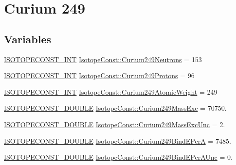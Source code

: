 \hypertarget{group___isotope_const-_curium-_cm249}{}\section{Curium 249}
\label{group___isotope_const-_curium-_cm249}
\subsection*{Variables}
\begin{DoxyCompactItemize}
\item 
\mbox{\hyperlink{group___isotope_const-_macros_ga5f18360b3e99483a35c32d789e62621c}{I\+S\+O\+T\+O\+P\+E\+C\+O\+N\+S\+T\+\_\+\+I\+NT}} \mbox{\hyperlink{group___isotope_const-_curium-_cm249_gaf093c22f0fdc8d87c691b7add8e28bb1}{Isotope\+Const\+::\+Curium249\+Neutrons}} = 153
\item 
\mbox{\hyperlink{group___isotope_const-_macros_ga5f18360b3e99483a35c32d789e62621c}{I\+S\+O\+T\+O\+P\+E\+C\+O\+N\+S\+T\+\_\+\+I\+NT}} \mbox{\hyperlink{group___isotope_const-_curium-_cm249_gadf2b4b864663bd0c4d486a707db37406}{Isotope\+Const\+::\+Curium249\+Protons}} = 96
\item 
\mbox{\hyperlink{group___isotope_const-_macros_ga5f18360b3e99483a35c32d789e62621c}{I\+S\+O\+T\+O\+P\+E\+C\+O\+N\+S\+T\+\_\+\+I\+NT}} \mbox{\hyperlink{group___isotope_const-_curium-_cm249_ga9c8f60897fa67e71b5972e6ed6be6d09}{Isotope\+Const\+::\+Curium249\+Atomic\+Weight}} = 249
\item 
\mbox{\hyperlink{group___isotope_const-_macros_ga8f45a7272ce02c0b4c65c44636ed719a}{I\+S\+O\+T\+O\+P\+E\+C\+O\+N\+S\+T\+\_\+\+D\+O\+U\+B\+LE}} \mbox{\hyperlink{group___isotope_const-_curium-_cm249_ga75b0f4beec031155580c9799ebe4565f}{Isotope\+Const\+::\+Curium249\+Mass\+Exc}} = 70750.
\item 
\mbox{\hyperlink{group___isotope_const-_macros_ga8f45a7272ce02c0b4c65c44636ed719a}{I\+S\+O\+T\+O\+P\+E\+C\+O\+N\+S\+T\+\_\+\+D\+O\+U\+B\+LE}} \mbox{\hyperlink{group___isotope_const-_curium-_cm249_ga10ce6d435112f429bc7e6b9e3e1cf030}{Isotope\+Const\+::\+Curium249\+Mass\+Exc\+Unc}} = 2.
\item 
\mbox{\hyperlink{group___isotope_const-_macros_ga8f45a7272ce02c0b4c65c44636ed719a}{I\+S\+O\+T\+O\+P\+E\+C\+O\+N\+S\+T\+\_\+\+D\+O\+U\+B\+LE}} \mbox{\hyperlink{group___isotope_const-_curium-_cm249_gaac55793fb0d592434fd251e22b7fbac6}{Isotope\+Const\+::\+Curium249\+Bind\+E\+PerA}} = 7485.
\item 
\mbox{\hyperlink{group___isotope_const-_macros_ga8f45a7272ce02c0b4c65c44636ed719a}{I\+S\+O\+T\+O\+P\+E\+C\+O\+N\+S\+T\+\_\+\+D\+O\+U\+B\+LE}} \mbox{\hyperlink{group___isotope_const-_curium-_cm249_ga4d112b36baf74206b740559290740e07}{Isotope\+Const\+::\+Curium249\+Bind\+E\+Per\+A\+Unc}} = 0.

\end{DoxyCompactItemize}
